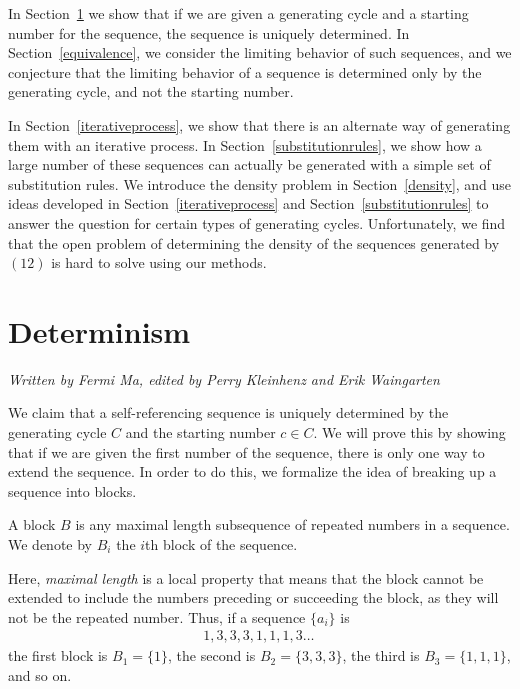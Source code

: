 \documentclass[runningheads,a4paper]{llncs}
\begin{document}
In Section~\ref{determinism} we show that if we are given a generating cycle and a starting number for the sequence, the sequence is uniquely determined. In Section~\ref{equivalence}, we consider the limiting behavior of such sequences, and we conjecture that the limiting behavior of a sequence is determined only by the generating cycle, and not the starting number. 

In Section~\ref{iterativeprocess}, we show that there is an alternate way of generating them with an iterative process. In Section~\ref{substitutionrules}, we show how a large number of these sequences can actually be generated with a simple set of substitution rules. We introduce the density problem in Section~\ref{density}, and use ideas developed in Section~\ref{iterativeprocess} and Section~\ref{substitutionrules} to answer the question for certain types of generating cycles. Unfortunately, we find that the open problem of determining the density of the sequences generated by $(12)$ is hard to solve using our methods.

\section{Determinism}
\label{determinism}

\emph{Written by Fermi Ma, edited by Perry Kleinhenz and Erik Waingarten}

We claim that a self-referencing sequence is uniquely determined by the generating cycle $C$ and the starting number $c \in C$. We will prove this by showing that if we are given the first number of the sequence, there is only one way to extend the sequence. In order to do this, we formalize the idea of breaking up a sequence into blocks.

\begin{definition}
A block $B$ is any maximal length subsequence of repeated numbers in a sequence. We denote by $B_i$ the $i$th block of the sequence.
\end{definition}

Here, \emph{maximal length} is a local property that means that the block cannot be extended to include the numbers preceding or succeeding the block, as they will not be the repeated number. Thus, if a sequence $\{a_i\}$ is
\begin{align*}
1,3,3,3,1,1,1,3\dots \,
\end{align*}
the first block is $B_1 = \{1\}$, the second is $B_2 = \{3,3,3\}$, the third is $B_3 = \{1,1,1\}$, and so on. 
\end{document}
